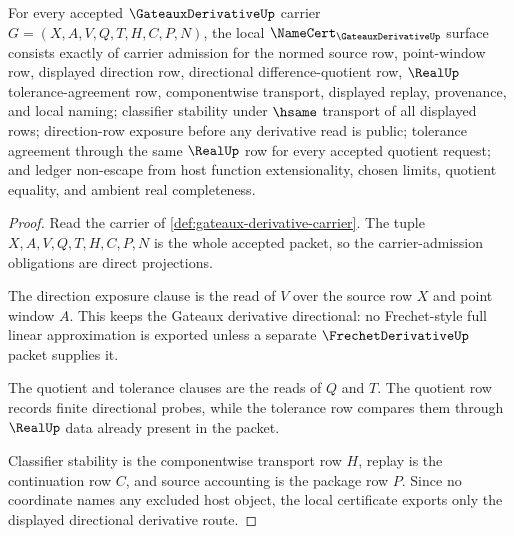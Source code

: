 \begin{theorem}
\label{thm:gateaux-derivative-namecert-obligations}
For every accepted $\GateauxDerivativeUp$ carrier $G=(X,A,V,Q,T,H,C,P,N)$, the local $\NameCert_{\GateauxDerivativeUp}$ surface consists exactly of carrier admission for the normed source row, point-window row, displayed direction row, directional difference-quotient row, $\RealUp$ tolerance-agreement row, componentwise transport, displayed replay, provenance, and local naming; classifier stability under $\hsame$ transport of all displayed rows; direction-row exposure before any derivative read is public; tolerance agreement through the same $\RealUp$ row for every accepted quotient request; and ledger non-escape from host function extensionality, chosen limits, quotient equality, and ambient real completeness.
\end{theorem}
\begin{proof}
Read the carrier of \autoref{def:gateaux-derivative-carrier}. The tuple $X,A,V,Q,T,H,C,P,N$ is the whole accepted packet, so the carrier-admission obligations are direct projections.

The direction exposure clause is the read of $V$ over the source row $X$ and point window $A$. This keeps the Gateaux derivative directional: no Frechet-style full linear approximation is exported unless a separate $\FrechetDerivativeUp$ packet supplies it.

The quotient and tolerance clauses are the reads of $Q$ and $T$. The quotient row records finite directional probes, while the tolerance row compares them through $\RealUp$ data already present in the packet.

Classifier stability is the componentwise transport row $H$, replay is the continuation row $C$, and source accounting is the package row $P$. Since no coordinate names any excluded host object, the local certificate exports only the displayed directional derivative route.
\end{proof}

